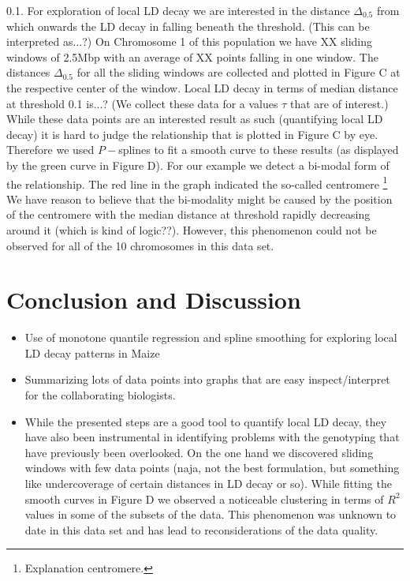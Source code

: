 \documentclass[twoside]{report}
\begin{document}
\begin{itemize}
	0.1. For exploration of local LD decay we are interested in the distance $\Delta_{0.5}$ from 
	which onwards the LD decay in falling beneath the threshold. (This can be interpreted as...?)
	On Chromosome 1 of this population we have XX sliding windows of 2.5Mbp with an 
	average of XX points falling in one window. The distances 
	$\Delta_{0.5}$ for all the sliding windows are collected and plotted in Figure C 
	at the respective center of the window. Local 
	LD decay in terms of median distance at threshold 0.1 is...? (We collect these data for a 
	values $\tau$ that are of interest.) While these data points are an interested result as
	such (quantifying local LD decay) it is hard to judge the relationship that is plotted in 
	Figure C by eye. Therefore we used $P-$splines to fit a smooth curve to these results (as 
	displayed by the green curve in Figure D). For our example we detect a bi-modal form of the 
	relationship. The red line in the graph indicated the so-called centromere \footnote{
	Explanation centromere.} We have reason to believe that the bi-modality might be caused by 
	the position of the centromere with the median distance at threshold rapidly decreasing 
	around it (which is kind of logic??). However, this phenomenon could not be observed for 
	all of the 10 chromosomes in this data set.   
\end{itemize}

\section{Conclusion and Discussion}

\begin{itemize}
\item Use of monotone quantile regression and spline smoothing for exploring 
	local LD decay patterns in Maize
\item Summarizing lots of data points into graphs that are easy inspect/interpret for the 
	collaborating biologists.
\item While the presented steps are a good tool to quantify local LD decay, they have also been 
	instrumental in identifying problems with the genotyping that have previously been 
	overlooked. On the one hand we discovered sliding windows with few data points (naja, not 
	the best formulation, but something like undercoverage of certain distances in LD decay 
	or so). While fitting the smooth curves in Figure D we observed a noticeable clustering 
	in terms of $R^2$ values in some of the subsets of the data. This phenomenon was unknown 
	to date in this data set and has lead to reconsiderations of the data quality.
\end{itemize}
\end{document}
